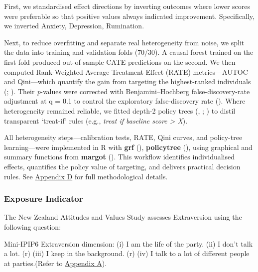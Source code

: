 \documentclass[
  single column]{article}
\begin{document}
First, we standardised effect directions by inverting outcomes where
lower scores were preferable so that positive values always indicated
improvement. Specifically, we inverted Anxiety, Depression, Rumination.

Next, to reduce overfitting and separate real heterogeneity from noise,
we split the data into training and validation folds (70/30). A causal
forest trained on the first fold produced out-of-sample CATE predictions
on the second. We then computed Rank-Weighted Average Treatment Effect
(RATE) metrics---AUTOC and Qini---which quantify the gain from targeting
the highest-ranked individuals (; ). Their
\emph{p}-values were corrected with Benjamini--Hochberg
false-discovery-rate adjustment at q = 0.1 to control the exploratory
false-discovery rate (). Where heterogeneity remained reliable, we fitted
depth-2 policy trees (,
;
) to distil
transparent `treat-if' rules (e.g., \emph{treat if baseline score
\textgreater{} X}).

All heterogeneity steps---calibration tests, RATE, Qini curves, and
policy-tree learning---were implemented in R with \textbf{grf}
(), \textbf{policytree}
(), using
graphical and summary functions from \textbf{margot}
(). This workflow identifies
individualised effects, quantifies the policy value of targeting, and
delivers practical decision rules. See
\hyperref[appendix-explain-grf]{Appendix D} for full methodological
details.

\subsubsection{Exposure Indicator}\label{exposure-indicator}

The New Zealand Attitudes and Values Study assesses Extraversion using
the following question:

Mini-IPIP6 Extraversion dimension: (i) I am the life of the party. (ii)
I don't talk a lot. (r) (iii) I keep in the background. (r) (iv) I talk
to a lot of different people at parties.(Refer to
\hyperref[appendix-measures]{Appendix A}).
\end{document}

